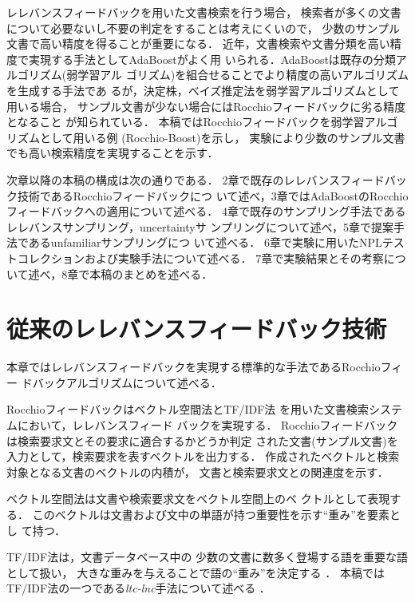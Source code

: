 レレバンスフィードバックを用いた文書検索を行う場合，
検索者が多くの文書について必要ないし不要の判定をすることは考えにくいので，
少数のサンプル文書で高い精度を得ることが重要になる．
近年，文書検索や文書分類を高い精度で実現する手法としてAdaBoostがよく用
いられる\cite{bib:Boost}．AdaBoostは既存の分類アルゴリズム(弱学習アル
ゴリズム)を組合せることでより精度の高いアルゴリズムを生成する手法であ
るが，決定株，ベイズ推定法を弱学習アルゴリズムとして用いる場合，
サンプル文書が少ない場合にはRocchioフィードバックに劣る精度となること
が知られている\cite{bib:Boost_and_Rocchio,bib:Yu}．
本稿ではRocchioフィードバックを弱学習アルゴリズムとして用いる例
(Rocchio-Boost)を示し，
実験により少数のサンプル文書でも高い検索精度を実現することを示す．

次章以降の本稿の構成は次の通りである．
2章で既存のレレバンスフィードバック技術であるRocchioフィードバックにつ
いて述べ，3章ではAdaBoostのRocchioフィードバックへの適用について述べる．
4章で既存のサンプリング手法であるレレバンスサンプリング，uncertaintyサ
ンプリングについて述べ，5章で提案手法であるunfamiliarサンプリングにつ
いて述べる．
6章で実験に用いたNPLテストコレクションおよび実験手法について述べる．
7章で実験結果とその考察について述べ，8章で本稿のまとめを述べる．


\section{従来のレレバンスフィードバック技術}
\label{sec:jyuurai}
本章ではレレバンスフィードバックを実現する標準的な手法であるRocchioフィー
ドバックアルゴリズムについて述べる．

Rocchioフィードバック\cite{bib:Rocchio}はベクトル空間法とTF/IDF法
\cite{bib:Salton}を用いた文書検索システムにおいて，レレバンスフィード
バックを実現する．
Rocchioフィードバックは検索要求文とその要求に適合するかどうか判定
された文書(サンプル文書)を入力として，検索要求を表すベクトルを出力する．
作成されたベクトルと検索対象となる文書のベクトルの内積が，
文書と検索要求文との関連度を示す．

ベクトル空間法\cite{bib:Salton}は文書や検索要求文をベクトル空間上のベ
クトルとして表現する．
このベクトルは文書および文中の単語が持つ重要性を示す``重み''を要素とし
て持つ．

TF/IDF法は，文書データベース中の
少数の文書に数多く登場する語を重要な語として扱い，
大きな重みを与えることで語の``重み''を決定する
\cite{bib:Salton,bib:Umino,bib:Buckley}．
本稿ではTF/IDF法の一つである{\it ltc-lnc}手法について述べる
\cite{bib:Buckley5}．


